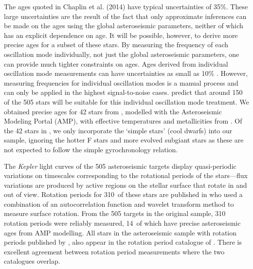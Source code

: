 \documentclass[useAMS, usenatbib]{mn2e}
\newcommand{\nastero}{310}
\newcommand{\nprecise}{14~}
\newcommand{\ngarcia}{310~}
\begin{document}
The ages quoted in Chaplin et al. (2014) have typical uncertainties of 35\%.
These large uncertainties are the result of the fact that only approximate
inferences can be made on the ages using the global asteroseismic parameters,
neither of which has an explicit dependence on age.
It will be possible, however, to derive more precise ages for a subset of
these stars.
By measuring the frequency of each oscillation mode individually,
not just the global asteroseismic parameters, one can provide much tighter
constraints on ages.
Ages derived from individual oscillation mode measurements can have
uncertainties as small as 10\% \citep{Brown1994, SilvaAguirre2013}.
However, measuring frequencies for individual oscillation modes is a manual
process and can only be applied in the highest signal-to-noise cases.
\citet{Chaplin2014} predict that around 150 of the 505 stars will be suitable
for this individual oscillation mode treatment.
We obtained precise ages for 42 stars from \citet{Metcalfe2014}, modelled with
the Asteroseismic Modeling Portal (AMP), with effective temperatures and
metallicities from \citet{Bruntt2012}.
Of the 42 stars in \citet{Metcalfe2014}, we only incorporate the `simple
stars' (cool dwarfs) into our sample, ignoring the hotter F stars and more
evolved subgiant stars as these are not expected to follow the simple
gyrochronology relation.

The {\it Kepler} light curves of the 505 asteroseismic targets display
quasi-periodic variations on timescales corresponding to the rotational
periods of the stars---flux variations are produced by active regions on the
stellar surface that rotate in and out of view.
Rotation periods for \ngarcia of these stars are published in
\citet{Garcia2014} who used a combination of an autocorrelation function and
wavelet transform method to measure surface rotation.
From the 505 targets in the original sample, \nastero$~$rotation periods were
reliably measured, \nprecise of which have precise asteroseismic ages from AMP
modelling.
All stars in the asteroseismic sample with rotation periods published by
\citet{McQuillan_2014}, also appear in the rotation period catalogue of
\citet{Garcia2014}.
There is excellent agreement between rotation period
measurements where the two catalogues overlap.
\end{document}
